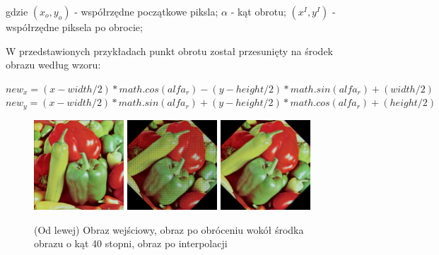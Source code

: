 \documentclass[final,a4paper,openany,12pt]{mwbk}
\begin{document}
	gdzie $(x_{o},y_{o})$ - współrzędne początkowe piksla; $\alpha$ - kąt obrotu; $(x^I,y^I)$ - współrzędne piksela po obrocie;

W przedstawionych przykładach punkt obrotu został przesunięty na środek obrazu według wzoru:

	\begin{center}
        $new_x = (x - width/2) * math.cos(alfa_r) - (y - height/2) * math.sin(alfa_r) + (width/2)$\\
        $new_y = (x - width/2) * math.sin(alfa_r) + (y - height/2) * math.cos(alfa_r) + (height/2)$\\
	\end{center}

\begin{figure}[H]
	\begin{center}
		\includegraphics[width=0.3\textwidth]{1/1Geo_Turn_Original}
		\includegraphics[width=0.3\textwidth]{1/1Geo_Turn_Result}
		\includegraphics[width=0.3\textwidth]{1/1Geo_Turn_Result_Interp}
	\end{center}
	\caption{(Od lewej) Obraz wejściowy, obraz po obróceniu wokół  środka obrazu o kąt 40 stopni, obraz po interpolacji }
\end{figure}
\end{document}
